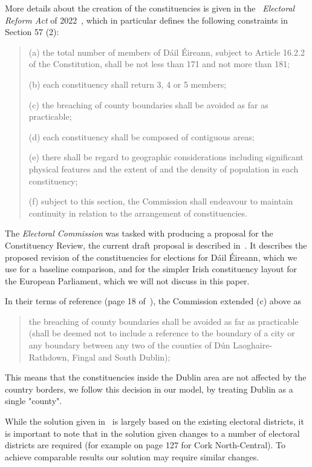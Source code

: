 \documentclass[runningheads]{llncs}
\begin{document}
More details about the creation of the constituencies is given in the ~\emph{Electoral Reform Act} of 2022~\cite{Ireland2022}, which in particular defines the following constraints in Section 57 (2):

\begin{quote}
(a) the total number of members of Dáil Éireann, subject to Article 16.2.2 of the Constitution, shall be not less than 171 and not more than 181;

(b) each constituency shall return 3, 4 or 5 members;

(c) the breaching of county boundaries shall be avoided as far as practicable;

(d) each constituency shall be composed of contiguous areas;

(e) there shall be regard to geographic considerations including significant physical features and the extent of and the density of population in each constituency;

(f) subject to this section, the Commission shall endeavour to maintain continuity in relation to the arrangement of constituencies.
\end{quote}


The \emph{Electoral Commission} was tasked with producing a proposal for the Constituency Review, the current draft proposal is described in~\cite{ElectoralCommission2023}. It describes the proposed revision of the constituencies for elections for Dáil Éireann, which we use for a baseline comparison, and for the simpler Irish constituency layout for the European Parliament, which we will not discuss in this paper.

In their terms of reference (page 18 of~\cite{ElectoralCommission2023}), the Commission extended (c) above as
\begin{quote}
the breaching of county boundaries shall be avoided as far as practicable (shall be deemed not to include a reference to the boundary of a city or any boundary between any two of the counties of Dún Laoghaire-Rathdown, Fingal and South Dublin);
\end{quote}
This means that the constituencies inside the Dublin area are not affected by the country borders, we follow this decision in our model, by treating Dublin as a single "county".  

While the solution given in~\cite{ElectoralCommission2023} is largely based on the existing electoral districts, it is important to note that in the solution given changes to a number of electoral districts are required (for example on page 127 for Cork North-Central). To achieve comparable results our solution may require similar changes.
\end{document}
